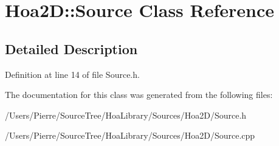 \hypertarget{class_hoa2_d_1_1_source}{\section{Hoa2\-D\-:\-:Source Class Reference}
\label{class_hoa2_d_1_1_source}
}


\subsection{Detailed Description}


Definition at line 14 of file Source.\-h.



The documentation for this class was generated from the following files\-:\begin{DoxyCompactItemize}
\item 
/\-Users/\-Pierre/\-Source\-Tree/\-Hoa\-Library/\-Sources/\-Hoa2\-D/Source.\-h\item 
/\-Users/\-Pierre/\-Source\-Tree/\-Hoa\-Library/\-Sources/\-Hoa2\-D/Source.\-cpp\end{DoxyCompactItemize}
